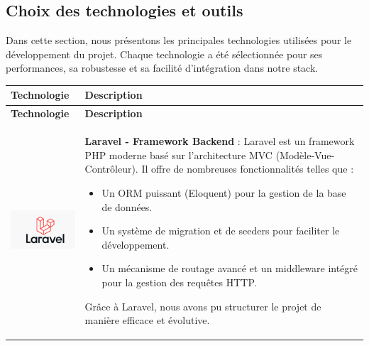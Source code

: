 
\subsection{Choix des technologies et outils}

Dans cette section, nous présentons les principales technologies utilisées pour le développement du projet. Chaque technologie a été sélectionnée pour ses performances, sa robustesse et sa facilité d’intégration dans notre stack.

\vspace{1cm} %


\begin{longtable}{|m{4cm}|m{10cm}|}
    \hline
    \textbf{Technologie} & \textbf{Description} \\
    \hline
    \endfirsthead

    \hline
    \textbf{Technologie} & \textbf{Description} \\
    \hline
    \endhead

    \hline
    \endfoot

    \hline
    \includegraphics[width=3cm]{images/logo/laravel.png} & 
    \textbf{Laravel - Framework Backend} : Laravel est un framework PHP moderne basé sur l’architecture MVC (Modèle-Vue-Contrôleur). Il offre de nombreuses fonctionnalités telles que :  
    \begin{itemize}
        \item Un ORM puissant (Eloquent) pour la gestion de la base de données.
        \item Un système de migration et de seeders pour faciliter le développement.
        \item Un mécanisme de routage avancé et un middleware intégré pour la gestion des requêtes HTTP.
    \end{itemize}
    Grâce à Laravel, nous avons pu structurer le projet de manière efficace et évolutive. \\
    \hline


\end{longtable}
